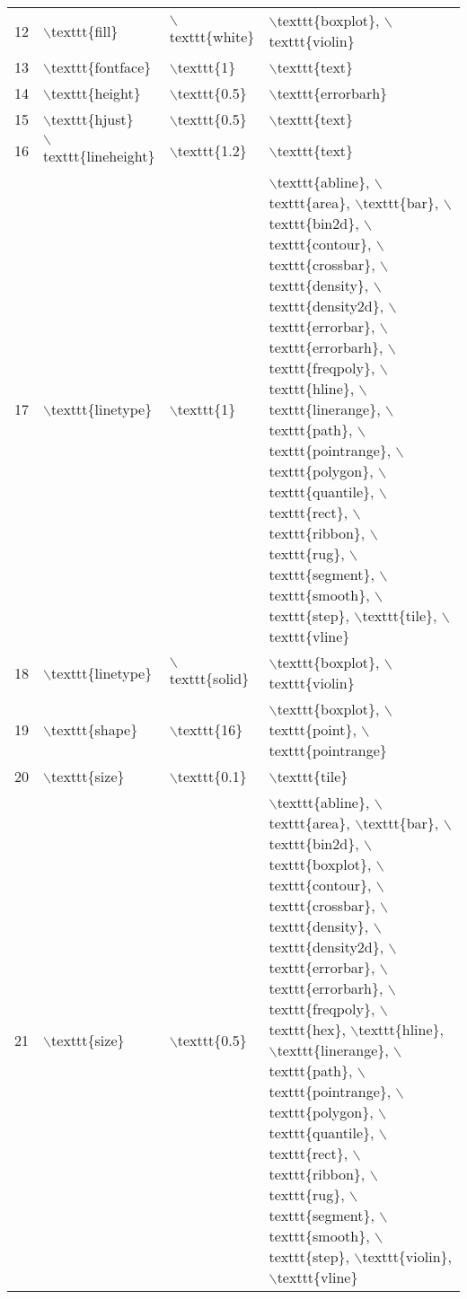 \begin{table}[ht]
\begin{tabular}{rlll}
  12 & $\backslash$texttt\{fill\} & $\backslash$texttt\{white\} & $\backslash$texttt\{boxplot\}, $\backslash$texttt\{violin\} \\ 
  13 & $\backslash$texttt\{fontface\} & $\backslash$texttt\{1\} & $\backslash$texttt\{text\} \\ 
  14 & $\backslash$texttt\{height\} & $\backslash$texttt\{0.5\} & $\backslash$texttt\{errorbarh\} \\ 
  15 & $\backslash$texttt\{hjust\} & $\backslash$texttt\{0.5\} & $\backslash$texttt\{text\} \\ 
  16 & $\backslash$texttt\{lineheight\} & $\backslash$texttt\{1.2\} & $\backslash$texttt\{text\} \\ 
  17 & $\backslash$texttt\{linetype\} & $\backslash$texttt\{1\} & $\backslash$texttt\{abline\}, $\backslash$texttt\{area\}, $\backslash$texttt\{bar\}, $\backslash$texttt\{bin2d\}, $\backslash$texttt\{contour\}, $\backslash$texttt\{crossbar\}, $\backslash$texttt\{density\}, $\backslash$texttt\{density2d\}, $\backslash$texttt\{errorbar\}, $\backslash$texttt\{errorbarh\}, $\backslash$texttt\{freqpoly\}, $\backslash$texttt\{hline\}, $\backslash$texttt\{linerange\}, $\backslash$texttt\{path\}, $\backslash$texttt\{pointrange\}, $\backslash$texttt\{polygon\}, $\backslash$texttt\{quantile\}, $\backslash$texttt\{rect\}, $\backslash$texttt\{ribbon\}, $\backslash$texttt\{rug\}, $\backslash$texttt\{segment\}, $\backslash$texttt\{smooth\}, $\backslash$texttt\{step\}, $\backslash$texttt\{tile\}, $\backslash$texttt\{vline\} \\ 
  18 & $\backslash$texttt\{linetype\} & $\backslash$texttt\{solid\} & $\backslash$texttt\{boxplot\}, $\backslash$texttt\{violin\} \\ 
  19 & $\backslash$texttt\{shape\} & $\backslash$texttt\{16\} & $\backslash$texttt\{boxplot\}, $\backslash$texttt\{point\}, $\backslash$texttt\{pointrange\} \\ 
  20 & $\backslash$texttt\{size\} & $\backslash$texttt\{0.1\} & $\backslash$texttt\{tile\} \\ 
  21 & $\backslash$texttt\{size\} & $\backslash$texttt\{0.5\} & $\backslash$texttt\{abline\}, $\backslash$texttt\{area\}, $\backslash$texttt\{bar\}, $\backslash$texttt\{bin2d\}, $\backslash$texttt\{boxplot\}, $\backslash$texttt\{contour\}, $\backslash$texttt\{crossbar\}, $\backslash$texttt\{density\}, $\backslash$texttt\{density2d\}, $\backslash$texttt\{errorbar\}, $\backslash$texttt\{errorbarh\}, $\backslash$texttt\{freqpoly\}, $\backslash$texttt\{hex\}, $\backslash$texttt\{hline\}, $\backslash$texttt\{linerange\}, $\backslash$texttt\{path\}, $\backslash$texttt\{pointrange\}, $\backslash$texttt\{polygon\}, $\backslash$texttt\{quantile\}, $\backslash$texttt\{rect\}, $\backslash$texttt\{ribbon\}, $\backslash$texttt\{rug\}, $\backslash$texttt\{segment\}, $\backslash$texttt\{smooth\}, $\backslash$texttt\{step\}, $\backslash$texttt\{violin\}, $\backslash$texttt\{vline\} \\ 

\end{tabular}
\end{table}

